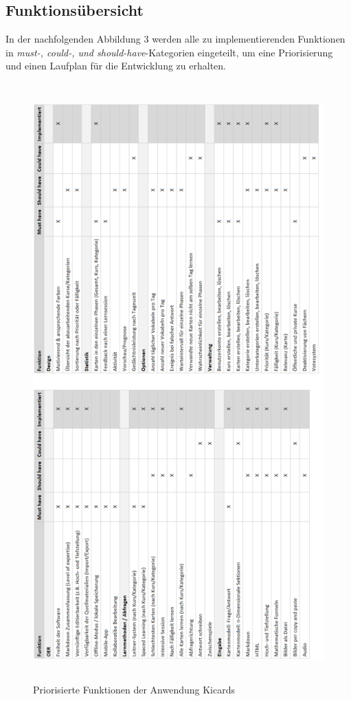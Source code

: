 \subsection{Funktionsübersicht}
In der nachfolgenden Abbildung 3 werden alle zu implementierenden Funktionen in \emph{must-, could-, und should-have}-Kategorien eingeteilt, um eine Priorisierung und einen Laufplan für die Entwicklung zu erhalten. \\

\begin{figure}[htbp]
\begin{center}
\includegraphics[width = 15cm, height=23cm]{must3.png}
\caption{Priorisierte Funktionen der Anwendung Kicards}
\label{Must-,Should-, Could-Have der Anwendung Kicards}

\end{center}
\end{figure}

